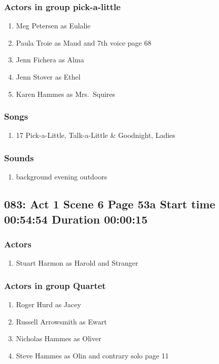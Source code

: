 \subsubsection{Actors in group pick-a-little}
\begin{enumerate}
\item Meg Petersen as Eulalie
\item Paula Troie as Maud and 7th voice page 68
\item Jenn Fichera as Alma
\item Jenn Stover as Ethel
\item Karen Hammes as Mrs.~Squires
\end{enumerate}

\subsubsection{Songs}
\begin{enumerate}
\item 17 Pick-a-Little, Talk-a-Little \& Goodnight, Ladies
\end{enumerate}\subsubsection{Sounds}
\begin{enumerate}
\item background evening outdoors
\end{enumerate}
\subsection{083: Act 1 Scene 6 Page 53a Start time 00:54:54 Duration 00:00:15}

\subsubsection{Actors}
\begin{enumerate}
\item Stuart Harmon as Harold and Stranger
\end{enumerate}
\subsubsection{Actors in group Quartet}
\begin{enumerate}
\item Roger Hurd as Jacey
\item Russell Arrowsmith as Ewart
\item Nicholas Hammes as Oliver
\item Steve Hammes as Olin and contrary solo page 11
\end{enumerate}
